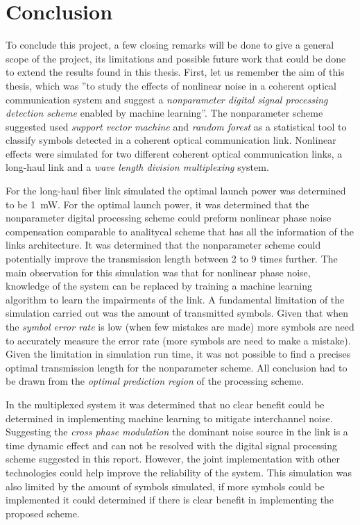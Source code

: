 \chapter{Conclusion}\label{ch:con}


To conclude this project, a few closing remarks will be done to give a general scope of the project, its limitations and possible future work that could be done to extend the results found in this thesis. First, let us remember the  aim of this thesis, which was ''to study the effects of nonlinear noise in a coherent optical communication system and suggest a \textit{nonparameter digital signal processing detection scheme} enabled by machine learning''. The nonparameter scheme suggested used \textit{support vector machine} and \textit{random forest} as a statistical tool to classify symbols detected in a coherent optical communication link. Nonlinear effects were simulated for two different coherent optical communication links, a long-haul link and a \textit{wave length division multiplexing} system.

For the long-haul fiber link simulated the optimal launch power was determined to be 1~mW. For the optimal launch power, it was determined that the nonparameter digital processing scheme could preform nonlinear phase noise compensation comparable to analitycal scheme that has all the information of the links architecture. It was determined that the nonparameter  scheme could potentially improve the transmission length between 2 to 9 times further. The main observation for this simulation was that for nonlinear phase noise, knowledge of the system can be replaced by training a machine learning algorithm to learn the impairments of the link. A fundamental limitation of the simulation carried out was the amount of transmitted symbols. Given that when the \textit{symbol error rate} is low (when few mistakes are made) more symbols are need to accurately measure the error rate (more symbols are need to make a mistake). Given the limitation in simulation run time, it was not possible to find a precises optimal transmission length for the nonparameter scheme. All conclusion had to be drawn from the \textit{optimal prediction region} of the processing scheme.

In the multiplexed system it was determined that no clear benefit could be determined in implementing machine learning to mitigate interchannel noise. Suggesting the \textit{cross phase modulation} the dominant noise source in the link is a time dynamic effect and can not be resolved with the digital signal processing scheme suggested in this report. However, the joint implementation with other technologies could help improve the reliability of the system. This simulation was also limited by the amount of symbols simulated, if more symbols could be implemented it could determined if there is clear benefit in implementing the proposed scheme. 


